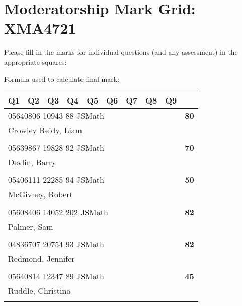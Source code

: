 \documentclass[a4paper,12pt]{article}
\begin{document}
\section*{Moderatorship Mark Grid: XMA4721}

Please fill in the marks for individual questions (and any assessment)
in the appropriate squares:

\vskip12pt

Formula used to calculate final mark:

\vskip60pt


\begin{tabular}{
   |p{9mm}|
    p{9mm}|
    p{9mm}|
    p{9mm}|
    p{9mm}|
    p{9mm}|
    p{9mm}|
    p{9mm}|
    p{9mm}|
    p{9mm}|}
\hline\hline
Q1 & Q2 & Q3 & Q4 & Q5 & Q6 & Q7 & Q8 & Q9 &     \\
\hline\hline
\multicolumn{9}{|l|}{05640806 10943 88 JSMath} & \textbf{80} \\
\hline
\multicolumn{10}{|l|}{Crowley Reidy, Liam} \\
\hline
   \vrule height8mm width0pt depth2mm 
      &    &    &    &    &    &    &    &    &     \\
\hline\hline
\multicolumn{9}{|l|}{05639867 19828 92 JSMath} & \textbf{70} \\
\hline
\multicolumn{10}{|l|}{Devlin, Barry} \\
\hline
   \vrule height8mm width0pt depth2mm 
      &    &    &    &    &    &    &    &    &     \\
\hline\hline
\multicolumn{9}{|l|}{05406111 22285 94 JSMath} & \textbf{50} \\
\hline
\multicolumn{10}{|l|}{McGivney, Robert} \\
\hline
   \vrule height8mm width0pt depth2mm 
      &    &    &    &    &    &    &    &    &     \\
\hline\hline
\multicolumn{9}{|l|}{05608406 14052 202 JSMath} & \textbf{82} \\
\hline
\multicolumn{10}{|l|}{Palmer, Sam} \\
\hline
   \vrule height8mm width0pt depth2mm 
      &    &    &    &    &    &    &    &    &     \\
\hline\hline
\multicolumn{9}{|l|}{04836707 20754 93 JSMath} & \textbf{82} \\
\hline
\multicolumn{10}{|l|}{Redmond, Jennifer} \\
\hline
   \vrule height8mm width0pt depth2mm 
      &    &    &    &    &    &    &    &    &     \\
\hline\hline
\multicolumn{9}{|l|}{05640814 12347 89 JSMath} & \textbf{45} \\
\hline
\multicolumn{10}{|l|}{Ruddle, Christina} \\
\hline
   \vrule height8mm width0pt depth2mm 
      &    &    &    &    &    &    &    &    &     \\
\hline\hline
\end{tabular}
\newpage
\end{document}
